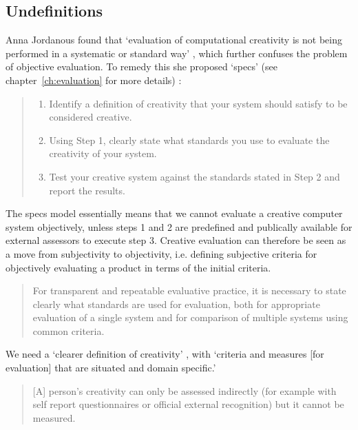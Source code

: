

\subsection{Undefinitions}

Anna Jordanous found that `evaluation of computational creativity is not being performed in a systematic or standard way' \autocite{Jordanous2011}, which further confuses the problem of objective evaluation. To remedy this she proposed `\gls{specs}' (see chapter~\ref{ch:evaluation} for more details) \autocite{Jordanous2012a}:

\begin{quote}
  \begin{enumerate}
    \item Identify a definition of creativity that your system should satisfy to be considered creative.
    \item Using Step 1, clearly state what standards you use to evaluate the creativity of your system.
    \item Test your creative system against the standards stated in Step 2 and report the results.
  \end{enumerate}
\end{quote}

The \gls{specs} model essentially means that we cannot evaluate a creative computer system objectively, unless steps 1 and 2 are predefined and publically available for external assessors to execute step 3. Creative evaluation can therefore be seen as a move from subjectivity to objectivity, i.e. defining subjective criteria for objectively evaluating a product in terms of the initial criteria.

\begin{quotation}
  For transparent and repeatable evaluative practice, it is necessary to state clearly what standards are used for evaluation, both for appropriate evaluation of a single system and for comparison of multiple systems using common criteria. 
\end{quotation}

We need a `clearer definition of creativity' \autocite[p.459]{Mayer1999}, with `criteria and measures [for evaluation] that are situated and domain specific.' \autocite[p.7]{Candy2012}

\begin{quotation}
  [A] person's creativity can only be assessed indirectly (for example with self report questionnaires or official external recognition) but it cannot be measured. 
\end{quotation}

